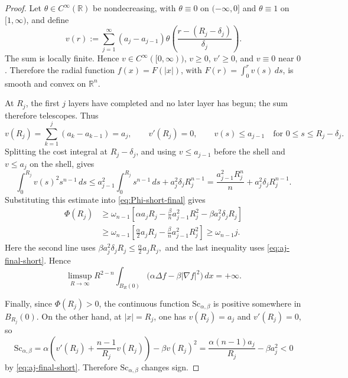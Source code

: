 \documentclass[10pt,a4paper]{amsart}
\begin{document}
\begin{proof}
Let \(\theta\in C^\infty(\mathbb R)\) be nondecreasing, with
\(\theta\equiv0\) on \((-\infty,0]\) and \(\theta\equiv1\) on
\([1,\infty)\), and define
\[
  v(r):=
  \sum_{j=1}^{\infty}
  (a_j-a_{j-1})
  \theta\!\left(\frac{r-(R_j-\delta_j)}{\delta_j}\right).
\]
The sum is locally finite. Hence \(v\in C^\infty([0,\infty))\), \(v\ge0\),
\(v'\ge0\), and \(v\equiv0\) near \(0\). Therefore the radial function
\(f(x)=F(|x|)\), with \(F(r)=\int_0^r v(s)\,ds\), is smooth and convex on
\(\mathbb R^n\).

At \(R_j\), the first \(j\) layers have completed and no later layer has
begun; the sum therefore telescopes. Thus
\[
  v(R_j)=\sum_{k=1}^j(a_k-a_{k-1})=a_j,
  \qquad
  v'(R_j)=0,
  \qquad
  v(s)\le a_{j-1}\quad\text{for }0\le s\le R_j-\delta_j.
\]
Splitting the cost integral at \(R_j-\delta_j\), and using \(v\le a_{j-1}\)
before the shell and \(v\le a_j\) on the shell, gives
\[
  \int_0^{R_j}v(s)^2s^{n-1}\,ds
  \le
  a_{j-1}^2\int_0^{R_j}s^{n-1}\,ds
  +
  a_j^2\delta_jR_j^{n-1}
  =
  \frac{a_{j-1}^2R_j^n}{n}
  +
  a_j^2\delta_jR_j^{n-1}.
\]
Substituting this estimate into \eqref{eq:Phi-short-final} gives
\[
\begin{aligned}
  \Phi(R_j)
  &\ge
  \omega_{n-1}
  \left[
    \alpha a_jR_j
    -
    \frac{\beta}{n}a_{j-1}^2R_j^2
    -
    \beta a_j^2\delta_jR_j
  \right]  \\
  &\ge
  \omega_{n-1}
  \left[
    \frac{\alpha}{2}a_jR_j
    -
    \frac{\beta}{n}a_{j-1}^2R_j^2
  \right]
  \ge
  \omega_{n-1}j.
\end{aligned}
\]
Here the second line uses
$\beta a_j^2\delta_jR_j\le \frac{\alpha}{2}a_jR_j,$
and the last inequality uses \eqref{eq:aj-final-short}. Hence
\[
  \limsup_{R\to\infty}
  R^{2-n}
  \int_{B_R(0)}
  \bigl(\alpha\Delta f-\beta|\nabla f|^2\bigr)\,dx
  =
  +\infty .
\]

Finally, since \(\Phi(R_j)>0\), the continuous function
\(\mathrm{Sc}_{\alpha,\beta}\) is positive somewhere in \(B_{R_j}(0)\). On the
other hand, at \(|x|=R_j\), one has \(v(R_j)=a_j\) and \(v'(R_j)=0\), so
\[
  \mathrm{Sc}_{\alpha,\beta}
  =
  \alpha\left(v'(R_j)+\frac{n-1}{R_j}v(R_j)\right)
  -
  \beta v(R_j)^2
  =
  \frac{\alpha(n-1)a_j}{R_j}-\beta a_j^2<0
\]
by \eqref{eq:aj-final-short}. Therefore
\(\mathrm{Sc}_{\alpha,\beta}\) changes sign.
\end{proof}
\end{document}
